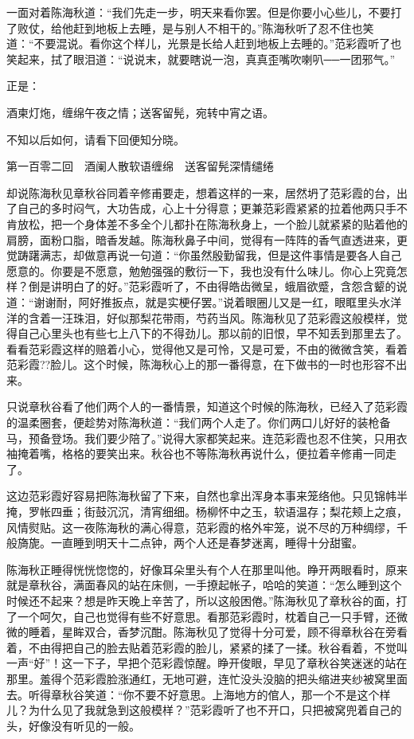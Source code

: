 \documentclass[12pt,UTF8]{ctexbook}
\begin{document}
{{{一面对着陈海秋道：“我们先走一步，明天来看你罢。但是你要小心些儿，不要打了败仗，给他赶到地板上去睡，是与别人不相干的。”陈海秋听了忍不住也笑道：“不要混说。看你这个样儿，光景是长给人赶到地板上去睡的。”范彩霞听了也笑起来，拭了眼泪道：“说说末，就要瞎说一泡，真真歪嘴吹喇叭──一团邪气。”

正是：

酒柬灯炧，缠绵午夜之情；送客留髡，宛转中宵之语。

不知以后如何，请看下回便知分晓。





第一百零二回　酒阑人散软语缠绵　送客留髡深情缱绻





却说陈海秋见章秋谷同着辛修甫要走，想着这样的一来，居然坍了范彩霞的台，出了自己的多时闷气，大功告成，心上十分得意；更兼范彩霞紧紧的拉着他两只手不肯放松，把一个身体差不多全个儿都扑在陈海秋身上，一个脸儿就紧紧的贴着他的肩膀，面粉口脂，暗香发越。陈海秋鼻子中间，觉得有一阵阵的香气直透进来，更觉踌躇满志，却做意再说一句道：“你虽然殷勤留我，但是这件事情是要各人自己愿意的。你要是不愿意，勉勉强强的敷衍一下，我也没有什么味儿。你心上究竟怎样？倒是讲明白了的好。”范彩霞听了，不由得皓齿微呈，蛾眉欲蹙，含怨含颦的说道：“谢谢耐，阿好推扳点，就是实梗仔罢。”说着眼圈儿又是一红，眼眶里头水洋洋的含着一汪珠泪，好似那梨花带雨，芍药当风。陈海秋见了范彩霞这般模样，觉得自己心里头也有些七上八下的不得劲儿。那以前的旧恨，早不知丢到那里去了。看看范彩霞这样的赔着小心，觉得他又是可怜，又是可爱，不由的微微含笑，看着范彩霞??脸儿。这个时候，陈海秋心上的那一番得意，在下做书的一时也形容不出来。

只说章秋谷看了他们两个人的一番情景，知道这个时候的陈海秋，已经入了范彩霞的温柔圈套，便趁势对陈海秋道：“我们两个人走了。你们两口儿好好的装枪备马，预备登场。我们要少陪了。”说得大家都笑起来。连范彩霞也忍不住笑，只用衣袖掩着嘴，格格的要笑出来。秋谷也不等陈海秋再说什么，便拉着辛修甫一同走了。

这边范彩霞好容易把陈海秋留了下来，自然也拿出浑身本事来笼络他。只见锦帏半掩，罗帐四垂；街鼓沉沉，清宵细细。杨柳怀中之玉，软语温存；梨花颊上之痕，风情熨贴。这一夜陈海秋的满心得意，范彩霞的格外牢笼，说不尽的万种绸缪，千般旖旎。一直睡到明天十二点钟，两个人还是春梦迷离，睡得十分甜蜜。

陈海秋正睡得恍恍惚惚的，好像耳朵里头有个人在那里叫他。睁开两眼看时，原来就是章秋谷，满面春风的站在床侧，一手撩起帐子，哈哈的笑道：“怎么睡到这个时候还不起来？想是昨天晚上辛苦了，所以这般困倦。”陈海秋见了章秋谷的面，打了一个呵欠，自己也觉得有些不好意思。看那范彩霞时，枕着自己一只手臂，还微微的睡着，星眸双合，香梦沉酣。陈海秋见了觉得十分可爱，顾不得章秋谷在旁看着，不由得把自己的脸去贴着范彩霞的脸儿，紧紧的揉了一揉。秋谷看着，不觉叫一声“好”！这一下子，早把个范彩霞惊醒。睁开俊眼，早见了章秋谷笑迷迷的站在那里。羞得个范彩霞脸涨通红，无地可避，连忙没头没脑的把头缩进夹纱被窝里面去。听得章秋谷笑道：“你不要不好意思。上海地方的倌人，那一个不是这个样儿？为什么见了我就急到这般模样？”范彩霞听了也不开口，只把被窝兜着自己的头，好像没有听见的一般。

}}}
\end{document}
